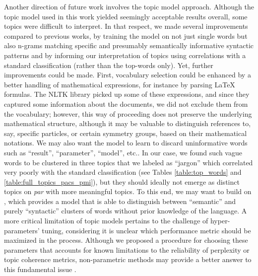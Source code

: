 \documentclass[smallextended]{svjour3}
\begin{document}
Another direction of future work involves the topic model approach. Although the topic model used in this work yielded seemingly acceptable results overall, some topics were difficult to interpret. In that respect, we made several improvements compared to previous works, by training the model on not just single words but also n-grams matching specific and presumably semantically informative syntactic patterns and by informing our interpretation of topics using correlations with a standard classification (rather than the top-words only). Yet, further improvements could be made. First, vocabulary selection could be enhanced by a better handling of mathematical expressions, for instance by parsing LaTeX formulas. The NLTK library picked up some of these expressions, and since they captured some information about the documents, we did not exclude them from the vocabulary; however, this way of proceeding does not preserve the underlying mathematical structure, although it may be valuable to distinguish references to, say, specific particles, or certain symmetry groups, based on their mathematical notations. We may also want the model to learn to discard uninformative words such as ``result'', ``parameter'', ``model'', etc.. In our case, we found such vague words to be clustered in three topics that we labeled as ``jargon'' which correlated very poorly with the standard classification (see Tables \ref{table:top_words} and \ref{table:full_topics_pacs_pmi}), but they should ideally not emerge as distinct topics on \textit{par} with more meaningful topics. To this end, we may want to build on \citealt{syntax_topic_model}, which provides a model that is able to distinguish between ``semantic'' and purely ``syntactic'' clusters of words without  prior knowledge of the language. A more critical limitation of topic models pertains to the challenge of hyper-parameters' tuning, considering it is unclear which performance metric should be maximized in the process. Although we proposed a procedure for choosing these parameters that accounts for known limitations to the reliability of perplexity or topic coherence metrics, non-parametric methods may provide a better answer to this fundamental issue \citep{Gerlach2018}.

\printglossary[type=\acronymtype,title=List of abbreviations]
\end{document}
